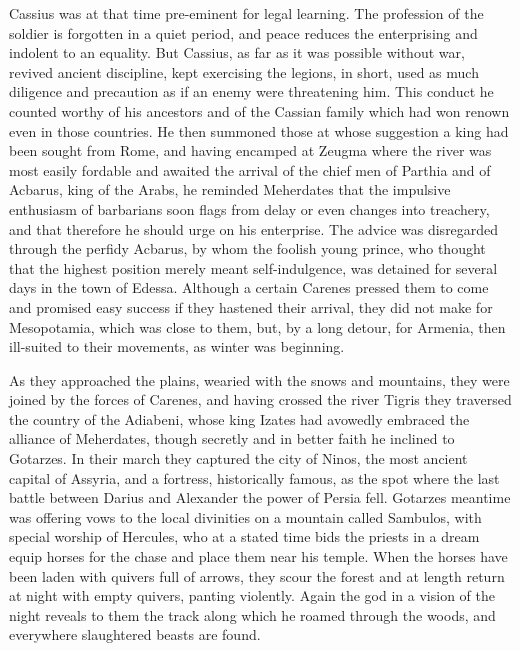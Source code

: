 Cassius was at that time pre-eminent for legal learning. The profession of the soldier is forgotten in a quiet period, and peace reduces the enterprising and indolent to an equality. But Cassius, as far as it was possible without war, revived ancient discipline, kept exercising the legions, in short, used as much diligence and precaution as if an enemy were threatening him. This conduct he counted worthy of his ancestors and of the Cassian family which had won renown even in those countries. He then summoned those at whose suggestion a king had been sought from Rome, and having encamped at Zeugma where the river was most easily fordable and awaited the arrival of the chief men of Parthia and of Acbarus, king of the Arabs, he reminded Meherdates that the impulsive enthusiasm of barbarians soon flags from delay or even changes into treachery, and that therefore he should urge on his enterprise. The advice was disregarded through the perfidy Acbarus, by whom the foolish young prince, who thought that the highest position merely meant self-indulgence, was detained for several days in the town of Edessa. Although a certain Carenes pressed them to come and promised easy success if they hastened their arrival, they did not make for Mesopotamia, which was close to them, but, by a long detour, for Armenia, then ill-suited to their movements, as winter was beginning.


As they approached the plains, wearied with the snows and mountains, they were joined by the forces of Carenes, and having crossed the river Tigris they traversed the country of the Adiabeni, whose king Izates had avowedly embraced the alliance of Meherdates, though secretly and in better faith he inclined to Gotarzes. In their march they captured the city of Ninos, the most ancient capital of Assyria, and a fortress, historically famous, as the spot where the last battle between Darius and Alexander the power of Persia fell. Gotarzes meantime was offering vows to the local divinities on a mountain called Sambulos, with special worship of Hercules, who at a stated time bids the priests in a dream equip horses for the chase and place them near his temple. When the horses have been laden with quivers full of arrows, they scour the forest and at length return at night with empty quivers, panting violently. Again the god in a vision of the night reveals to them the track along which he roamed through the woods, and everywhere slaughtered beasts are found.


